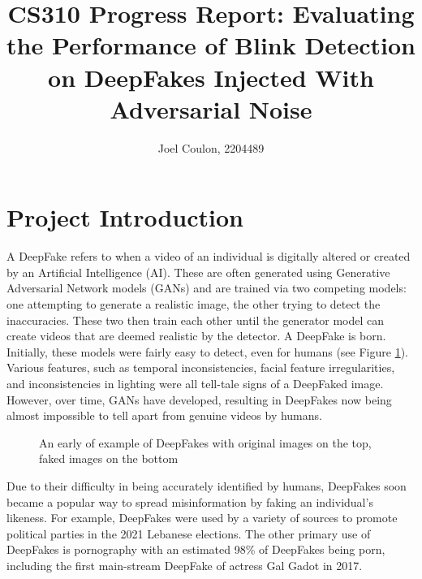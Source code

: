 \documentclass{article}
\title{CS310 Progress Report: Evaluating the Performance of Blink Detection on DeepFakes Injected With Adversarial Noise}
\author{Joel Coulon, 2204489}
\date{}
\begin{document}
\maketitle

\section{Project Introduction}

A DeepFake refers to when a video of an individual is digitally altered or created by an Artificial Intelligence (AI). These are often generated using Generative Adversarial Network models (GANs) and are trained via two competing models: one attempting to generate a realistic image, the other trying to detect the inaccuracies. These two then train each other until the generator model can create videos that are deemed realistic by the detector. A DeepFake is born.\\

Initially, these models were fairly easy to detect, even for humans (see Figure \ref{fig:earlyexample}). Various features, such as temporal inconsistencies, facial feature irregularities, and inconsistencies in lighting were all tell-tale signs of a DeepFaked image. However, over time, GANs have developed, resulting in DeepFakes now being almost impossible to tell apart from genuine videos by humans.

\begin{figure}[H]
    \centering
    \caption{An early of example of DeepFakes with original images on the top, faked images on the bottom\cite{earlydeepfakeimage}}
    \label{fig:earlyexample}
\end{figure}

Due to their difficulty in being accurately identified by humans, DeepFakes soon became a popular way to spread misinformation by faking an individual's likeness. For example, DeepFakes were used by a variety of sources to promote political parties in the 2021 Lebanese elections\cite{misinformation}. The other primary use of DeepFakes is pornography with an estimated 98\% of DeepFakes being porn\cite{pornography}, including the first main-stream DeepFake of actress Gal Gadot in 2017\cite{misinformation}.\\
\end{document}

